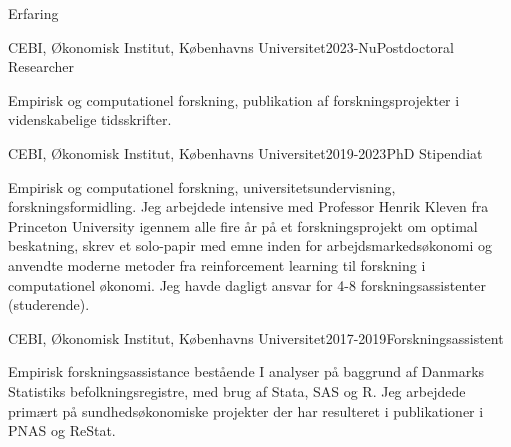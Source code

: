 \documentclass[
	10pt, %
]{resume} %
\begin{document}
\begin{rSection}{Erfaring}
    \begin{rSubsection}{CEBI, Økonomisk Institut, Københavns Universitet}{2023-Nu}{Postdoctoral Researcher}{}
        \item[] Empirisk og computationel forskning, publikation af forskningsprojekter i videnskabelige tidsskrifter.
    \end{rSubsection}

    \begin{rSubsection}{CEBI, Økonomisk Institut, Københavns Universitet}{2019-2023}{PhD Stipendiat}{}
        \item[] Empirisk og computationel forskning, universitetsundervisning, forskningsformidling. Jeg arbejdede intensive med Professor Henrik Kleven fra Princeton University igennem alle fire år på et forskningsprojekt om optimal beskatning, skrev et solo-papir med emne inden for arbejdsmarkedsøkonomi og anvendte moderne metoder fra reinforcement learning til forskning i computationel økonomi. Jeg havde dagligt ansvar for 4-8 forskningsassistenter (studerende).
    \end{rSubsection}

    \begin{rSubsection}{CEBI, Økonomisk Institut, Københavns Universitet}{2017-2019}{Forskningsassistent}{}
        \item[] Empirisk forskningsassistance bestående I analyser på baggrund af Danmarks Statistiks befolkningsregistre, med brug af Stata, SAS og R. Jeg arbejdede primært på sundhedsøkonomiske projekter der har resulteret i publikationer i PNAS og ReStat.
    \end{rSubsection}


\end{rSection}
\end{document}
